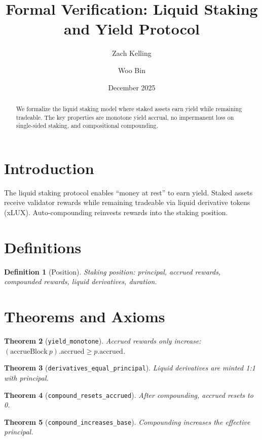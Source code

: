 \documentclass[11pt]{article}
\title{Formal Verification: Liquid Staking and Yield Protocol}
\author{Zach Kelling \and Woo Bin}
\date{December 2025}
\newtheorem{theorem}{Theorem}
\newtheorem{definition}[theorem]{Definition}
\begin{document}
\maketitle

\begin{abstract}
We formalize the liquid staking model where staked assets earn yield while remaining tradeable. The key properties are monotone yield accrual, no impermanent loss on single-sided staking, and compositional compounding.
\end{abstract}

\section{Introduction}
The liquid staking protocol enables ``money at rest'' to earn yield. Staked assets receive validator rewards while remaining tradeable via liquid derivative tokens (xLUX). Auto-compounding reinvests rewards into the staking position.

\section{Definitions}
\begin{definition}[Position]
Staking position: principal, accrued rewards, compounded rewards, liquid derivatives, duration.
\end{definition}


\section{Theorems and Axioms}
\begin{theorem}[\texttt{yield\_monotone}]
Accrued rewards only increase: $(\text{accrueBlock}~p).\text{accrued} \geq p.\text{accrued}$.
\end{theorem}

\begin{theorem}[\texttt{derivatives\_equal\_principal}]
Liquid derivatives are minted 1:1 with principal.
\end{theorem}

\begin{theorem}[\texttt{compound\_resets\_accrued}]
After compounding, accrued resets to 0.
\end{theorem}

\begin{theorem}[\texttt{compound\_increases\_base}]
Compounding increases the effective principal.
\end{theorem}
\end{document}
